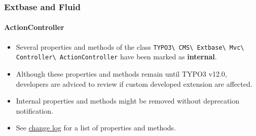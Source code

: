%

\begin{frame}[fragile]
	\frametitle{Extbase and Fluid}
	\framesubtitle{ActionController}

	\begin{itemize}
		\item Several properties and methods of the class
			\small\texttt{TYPO3\textbackslash
				CMS\textbackslash
				Extbase\textbackslash
				Mvc\textbackslash
				Controller\textbackslash
				ActionController}\normalsize
			have been marked as \textbf{internal}.
		\item Although these properties and methods remain until TYPO3 v12.0,\newline
			developers are adviced to review if custom developed extension are affected.
		\item Internal properties and methods might be removed without deprecation
			notification.
		\item See \href{https://docs.typo3.org/c/typo3/cms-core/master/en-us/Changelog/11.0/Important-92996-PropertiesAndMethodsInActionControllerMarkedInternal.html}{change log}
			for a list of properties and methods.
	\end{itemize}

\end{frame}

